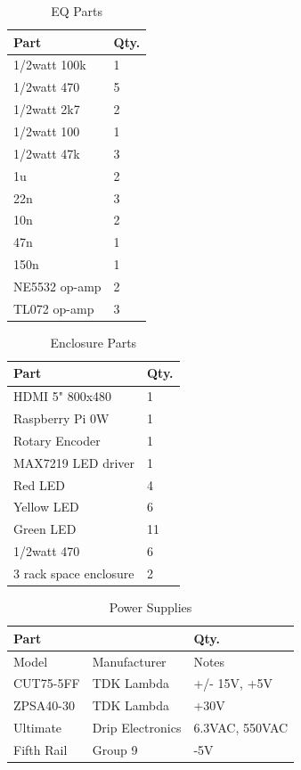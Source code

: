 \documentclass[journal]{IEEEtran}
\begin{document}
	\begin{table}[]
		\centering
		\caption{EQ Parts}
		\label{tab:eq}
		\begin{tabular}{l|l}
			Part                               & Qty. \\ \hline
			1/2watt 100k  & 1 \\ 
			1/2watt 470   & 5 \\
			1/2watt 2k7   & 2 \\
			1/2watt 100   & 1 \\
			1/2watt 47k   & 3 \\
			1u            & 2 \\
			22n           & 3 \\
			10n           & 2 \\
			47n           & 1 \\
			150n          & 1 \\
			NE5532 op-amp & 2 \\
			TL072 op-amp  & 3
		\end{tabular}
	\end{table}

	\begin{table}[]
		\centering
		\caption{Enclosure Parts}
		\label{tab:enclosure}
		\begin{tabular}{l|l}
			Part                               & Qty. \\ \hline
			HDMI 5" 800x480    & 1  \\
			Raspberry Pi 0W    & 1  \\
			Rotary Encoder     & 1  \\
			MAX7219 LED driver & 1  \\
			Red LED            & 4  \\
			Yellow LED         & 6  \\
			Green LED          & 11 \\
			1/2watt 470        & 6  \\
			3 rack space enclosure & 2
		\end{tabular}
	\end{table}


	\begin{table}[]
		\centering
		\caption{Power Supplies}
		\label{tab:powerSupplies}
		\begin{tabular}{l|l|l}
						Part                    &           & Qty. \\ \hline
			Model     & Manufacturer     & Notes          \\
			CUT75-5FF & TDK Lambda       & +/- 15V, +5V    \\
			ZPSA40-30 & TDK Lambda       & +30V           \\
			Ultimate  & Drip Electronics & 6.3VAC, 550VAC \\
			Fifth Rail  & Group 9 & -5V
		\end{tabular}
	\end{table}


	

	
	\ifCLASSOPTIONcaptionsoff
	\newpage
	\fi
	
	
	
	
	
\end{document}
